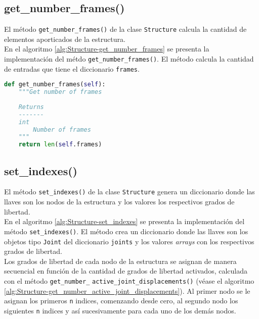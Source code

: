 \subsection{get\_number\_frames()}

El método \verb|get_number_frames()| de la clase \verb|Structure| calcula la cantidad de elementos aporticados de la estructura.\\

En el algoritmo \ref{alg:Structure-get_number_frames} se presenta la implementación del métdo \verb|get_number_frames()|. El método calcula la cantidad de entradas que tiene el diccionario \verb|frames|.\\

\begin{lstlisting}[language=Python,caption=Método \texttt{get\_number\_frames()} de la clase \texttt{Structure}.,label=alg:Structure-get_number_frames, frame=single]
def get_number_frames(self):
    """Get number of frames
    
    Returns
    -------
    int
        Number of frames
    """
    return len(self.frames)
\end{lstlisting}

\subsection{set\_indexes()}

El método \verb|set_indexes()| de la clase \verb|Structure| genera un diccionario donde las llaves son los nodos de la estructura y los valores los respectivos grados de libertad.\\

En el algoritmo \ref{alg:Structure-set_indexes} se presenta la implementación del método \verb|set_indexes()|. El método crea un diccionario donde las llaves son los objetos tipo \verb|Joint| del diccionario \verb|joints| y los valores \emph{arrays} con los respectivos grados de libertad.\\

Los grados de libertad de cada nodo de la estructura se asignan de manera secuencial en función de la cantidad de grados de libertad activados, calculada con el método \verb|get_number_| \verb|active_joint_displacements()| (véase el algoritmo \ref{alg:Structure-get_number_active_joint_displacements}). Al primer nodo se le asignan los primeros \verb|n| indices, comenzando desde cero, al segundo nodo los siguientes \verb|n| indices y así sucesivamente para cada uno de los demás nodos.\\

